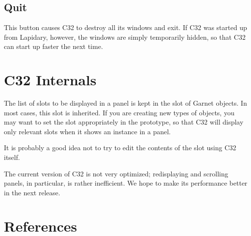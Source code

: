 \section{Quit}

This button causes C32 to destroy all its windows and exit.  If C32 was
started up from Lapidary, however, the windows are simply temporarily
hidden, so that C32 can start up faster the next time.



\chapter{C32 Internals}

The list of slots to be displayed in a panel is kept in the
 slot of Garnet objects.  In most cases, this slot is
inherited.  If you are creating new types of objects, you may want to set
the  slot appropriately in the prototype, so that C32
will display only relevant slots when it shows an instance in a panel.

It is probably a good idea not to try to edit the contents of the
 slot using C32 itself.

The current version of C32 is not very optimized; redisplaying and
scrolling panels, in particular, is rather inefficient.  We hope to make
its performance better in the next release.


\chapter*{References}

